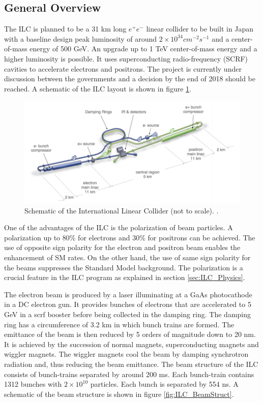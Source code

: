 \subsection{General Overview}

The ILC is planned to be a 31 km long $e^+e^-$ linear collider to be built in Japan with a baseline design peak luminosity of around $2 \times 10^{34} cm^{-2}s^{-1}$ and a center-of-mass energy of 500 GeV. An upgrade up to 1 TeV center-of-mass energy and a higher luminosity is possible. It uses superconducting radio-frequency (SCRF) cavities to accelerate electrons and positrons. The project is currently under discussion between the governments and a decision by the end of 2018 should be reached. A schematic of the ILC layout is shown in figure \ref{fig:ILC_schematic}.

\begin{figure}[htbp!]
  \centering
  \includegraphics[width=0.8\linewidth]{chap2/fig/ILC_schematic.png}
  \caption{Schematic of the International Linear Collider (not to scale). \cite{ILC_TDR_Vol1}.} \label{fig:ILC_schematic}
\end{figure}

One of the advantages of the ILC is the polarization of beam particles. A polarization up to 80\% for electrons and 30\% for positrons can be achieved. The use of opposite sign polarity for the electron and positron beam enables the enhancement of SM rates. On the other hand, the use of same sign polarity for the beams suppresses the Standard Model background. The polarization is a crucial feature in the ILC program as explained in section \ref{sec:ILC_Physics}.

The electron beam is produced by a laser illuminating at a GaAs photocathode in a DC electron gun. It provides bunches of electrons that are accelerated to 5 GeV in a \acrshort{scrf} booster before being collected in the damping ring. The damping ring has a circumference of 3.2 km in which bunch trains are formed. The emittance of the beam is then reduced by 5 orders of magnitude down to 20 nm. It is achieved by the succession of normal magnets, superconducting magnets and wiggler magnets. The wiggler magnets cool the beam by damping synchrotron radiation and, thus reducing the beam emittance. The beam structure of the ILC consists of bunch-trains separated by around 200 ms. Each bunch-train contains 1312 bunches with $2 \times 10^{10}$ particles. Each bunch is separated by 554 ns. A schematic of the beam structure is shown in figure \ref{fig:ILC_BeamStruct}.

